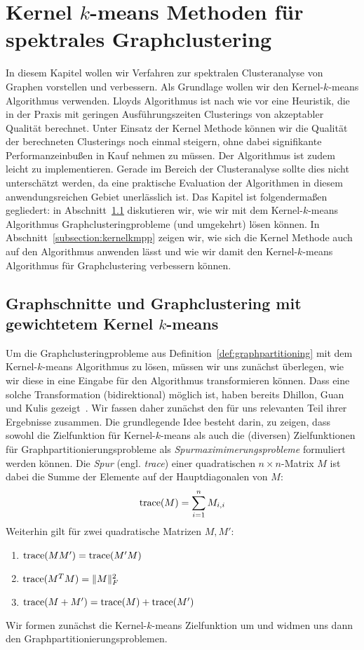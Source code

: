 \section{Kernel \texorpdfstring{$k$}{k}-means Methoden für spektrales Graphclustering}
\label{section:main}

In diesem Kapitel wollen wir Verfahren zur spektralen Clusteranalyse von Graphen vorstellen und verbessern. Als Grundlage wollen
wir den Kernel-$k$-means Algorithmus verwenden. Lloyds Algorithmus ist nach wie vor eine Heuristik, die in der Praxis mit geringen
Ausführungszeiten Clusterings von akzeptabler Qualität berechnet. Unter Einsatz der Kernel Methode können wir die
Qualität der berechneten Clusterings noch einmal steigern, ohne dabei signifikante Performanzeinbußen in Kauf nehmen zu müssen.
Der Algorithmus ist zudem leicht zu implementieren. Gerade im Bereich der Clusteranalyse sollte dies nicht unterschätzt werden,
da eine praktische Evaluation der Algorithmen in diesem anwendungsreichen Gebiet unerlässlich ist.
\absatz
Das Kapitel ist folgendermaßen gegliedert: in Abschnitt~\ref{subsection:wkkm-graphcut-graphclustering} diskutieren wir, wie wir
mit dem Kernel-$k$-means Algorithmus Graphclusteringprobleme (und umgekehrt) lösen können. In Abschnitt~\ref{subsection:kernelkmpp}
zeigen wir, wie sich die Kernel Methode auch auf den Algorithmus \kmpp{} anwenden lässt und wie wir damit den
Kernel-$k$-means Algorithmus für Graphclustering verbessern können.

\subsection{Graphschnitte und Graphclustering mit gewichtetem Kernel \texorpdfstring{$k$}{k}-means}
\label{subsection:wkkm-graphcut-graphclustering}

Um die Graphclusteringprobleme aus Definition~\ref{def:graphpartitioning} mit dem Kernel-$k$-means Algorithmus zu lösen,
müssen wir uns zunächst überlegen, wie wir diese in eine Eingabe für den Algorithmus transformieren können. Dass eine solche
Transformation (bidirektional) möglich ist, haben bereits Dhillon, Guan und Kulis gezeigt~\cite{DhillonGK04,DhillonGK07}. Wir
fassen daher zunächst den für uns relevanten Teil ihrer Ergebnisse zusammen.
\absatz
Die grundlegende Idee besteht darin, zu zeigen, dass sowohl die Zielfunktion für Kernel-$k$-means als auch die (diversen)
Zielfunktionen für Graphpartitionierungsprobleme als \emph{Spurmaximimerungsprobleme} formuliert werden können. Die
\emph{Spur} (engl. \emph{trace}) einer quadratischen $n \times n$-Matrix $M$ ist dabei die Summe der Elemente auf der
Hauptdiagonalen von $M$:
\[ \operatorname*{trace}(M) = \sum_{i=1}^{n} M_{i,i} \]
Weiterhin gilt für zwei quadratische Matrizen $M,M'$:
\begin{enumerate}
	\item 	$\operatorname*{trace}(MM') = \operatorname*{trace}(M'M)$
	\item 	$\operatorname*{trace}(M^TM) = \lVert{M}\rVert_F^2$
	\item 	$\operatorname*{trace}(M+M') = \operatorname*{trace}(M) + \operatorname*{trace}(M')$
\end{enumerate}
Wir formen zunächst die Kernel-$k$-means Zielfunktion um und widmen uns dann den Graphpartitionierungsproblemen.


